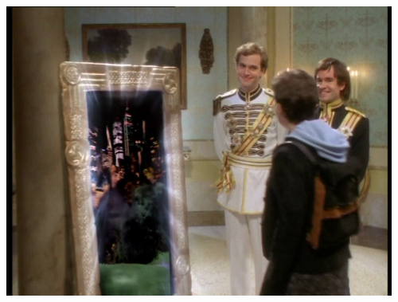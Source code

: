 \documentclass[12pt,letterpaper,landscape,KOMA,smallheadings,calcdimensions,display]{powersem}
\begin{document}
\begin{slide}

\vspace*{-1cm}
\begin{center}
\includegraphics[width=12.8cm]{vlcsnap-2011-05-13-06h16m46s25.png}
\end{center}

\vspace{-6.5cm}

\end{slide}

\begin{slide}

\end{slide}


\begin{slide}

\end{slide}


\begin{slide}

\end{slide}
\end{document}
